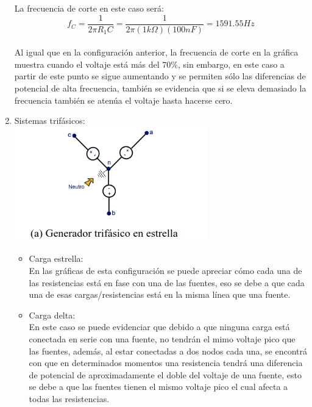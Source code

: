 \documentclass[12pt]{article}
\begin{document}
\begin{enumerate}
		\noindent La frecuencia de corte en este caso será:\\
		
		\begin{equation}
			f_C = \frac{1}{2\pi R_1 C} = \frac{1}{2\pi (1k\Omega) (100nF)} = 1591.55Hz
		\end{equation}\\
	
		\noindent Al igual que en la configuración anterior, la frecuencia de corte en la gráfica muestra cuando el voltaje está más del $70\%$, sin embargo, en este caso a partir de este punto se sigue aumentando y se permiten sólo las diferencias de potencial de alta frecuencia, también se evidencia que si se eleva demasiado la frecuencia también se atenúa el voltaje hasta hacerse cero.\\
		
		\item Sistemas trifásicos:\\
		
		\includegraphics{Img/2_4_a}\\
		
		\begin{itemize}
			\item Carga estrella:\\
			
			\noindent En las gráficas de esta configuración se puede apreciar cómo cada una de las resistencias está en fase con una de las fuentes, eso se debe a que cada una de esas cargas/resistencias está en la misma línea que una fuente.\\
			
			\item Carga delta:\\
			
			\noindent En este caso se puede evidenciar que debido a que ninguna carga está conectada en serie con una fuente, no tendrán el mimo voltaje pico que las fuentes, además, al estar conectadas a dos nodos cada una, se encontrá con que en determinados momentos una resistencia tendrá una diferencia de potencial de aproximadamente el doble del voltaje de una fuente, esto se debe a que las fuentes tienen el mismo voltaje pico el cual afecta a todas las resistencias.\\
			

\end{itemize}
\end{enumerate}
\end{document}
